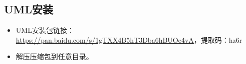 \subsection{UML安装}
\begin{itemize}
\item UML安装包链接：\url{https://pan.baidu.com/s/1gTXX4B5hT3Dba6hBUOe4vA}，提取码：hz6r 
\item 解压压缩包到任意目录。
\end{itemize}

